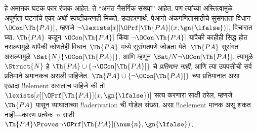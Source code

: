\documentclass[../../../include/open-logic-section]{subfiles}
\begin{document}
हे अमानक घटक फार रंजक आहेत: ते ``अनंत नैसर्गिक संख्या'' आहेत. पण त्यांच्या
अस्तित्वामुळे अपूर्णता-घटनांचे एका अर्थी स्पष्टीकरणही मिळते. उदाहरणार्थ,
पेआनो अंकगणितासाठीचे सुसंगतता-विधान $\OCon[\Th{PA}]$, म्हणजे $\lnot
\lexists[x][\OPrf[\Th{PA}](x, \gn{\lfalse})]$, विचारात घ्या.
$\Th{PA}$ कडून $\OCon[\Th{PA}]$ किंवा $\lnot \OCon[\Th{PA}]$ यांपैकी
काहीही सिद्ध होत नसल्यामुळे यांपैकी कोणतेही विधान~$\Th{PA}$ मध्ये सुसंगतपणे
जोडता येते. $\Th{PA}$ सुसंगत असल्यामुळे
$\Sat{N}{\OCon[\Th{PA}]}$, आणि म्हणून $\Sat/{N}{\lnot
  \OCon[\Th{PA}]}$. त्यामुळे $\Struct{N}$ हे $\Th{PA}
\cup \{\lnot \OCon[\Th{PA}]\}$ चे \emph{प्रतिमान नाही}, आणि त्या उपपत्तीची
सर्व प्रतिमाने अमानकच असली पाहिजेत. $\Th{PA} \cup \{\lnot
\OCon[\Th{PA}]\}$ च्या प्रतिमानात असा एखादा !!{element} असलाच पाहिजे की
तो $\lexists[x][\OPrf[\Th{PA}](x, \gn{\lfalse})]$ सत्य करणारा साक्षी
ठरेल, म्हणजे~$\Th{PA}$ पासून व्याघाताच्या !!a{derivation} ची गोडेल संख्या.
असा !!a{element} मानक असू शकत नाही---कारण प्रत्येक~$n$ साठी
$\Th{PA} \Proves \lnot \OPrf[\Th{PA}](\num{n}, \gn{\lfalse})$.
\end{document}
